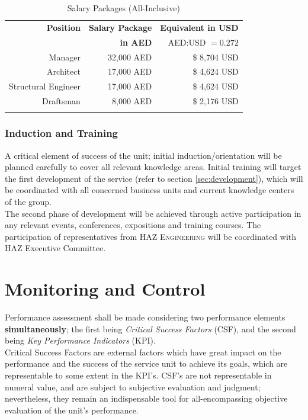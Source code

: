 \documentclass[a4paper,oneside,12pt,final]{article}
\begin{document}
\begin{table}[h]
	\centering
	\begin{tabular}{rrr}
	\toprule
	\textbf{Position}&\textbf{Salary Package}&\textbf{Equivalent in USD}\\
	&\textbf{in AED}&\footnotesize AED:USD $=0.272$ \vspace{0.2cm}\\ 
	\midrule
	\normalsize
	Manager&32,000 AED&\$ 8,704 USD\\
	Architect&17,000 AED &\$ 4,624 USD\\
	Structural Engineer&17,000 AED &\$ 4,624 USD\\
	Draftsman&8,000 AED&\$ 2,176 USD\\
	\bottomrule
	\label{tab:wages}
	\end{tabular}
	\caption{Salary Packages (All-Inclusive)}
\end{table}

\subsubsection{Induction and Training}
A critical element of success of the unit; initial induction/orientation will be planned carefully to cover all relevant knowledge areas. Initial training will target the first development of the service (refer to section \ref{sec:development}), which will be coordinated with all concerned business units and current knowledge centers of the group.\\

The second phase of development will be achieved through active participation in any relevant events, conferences, expositions and training courses. The participation of representatives from \textsc{HAZ Engineering} will be coordinated with HAZ Executive Committee.
 
\section{Monitoring and Control}
\label{sec:control}

Performance assessment shall be made considering two performance elements \textbf{simultaneously}; the first being \emph{Critical Success Factors} (CSF), and the second being \emph{Key Performance Indicators} (KPI).\\

Critical Success Factors are external factors which have great impact on the performance and the success of the service unit to achieve its goals, which are representable to some extent in the KPI's. CSF's are not representable in numeral value, and are subject to subjective evaluation and judgment; nevertheless, they remain an indispensable tool for all-encompassing objective evaluation of the unit's performance.\\
\end{document}
